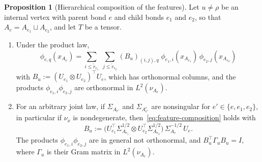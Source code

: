 \documentclass[11pt]{article}
\theoremstyle{definition}
\newtheorem{proposition}[theorem]{Proposition}
\numberwithin{equation}{section}
\begin{document}
\begin{proposition}[Hierarchical composition of the features]\label{prop:dw-nested}
Let $u\neq\rho$ be an internal vertex with parent bond $e$ and child bonds $e_1$ and $e_2$, so that $A_e=A_{e_1}\sqcup A_{e_2}$, and let $T$ be a tensor.
\begin{enumerate}[label=(\roman*),nosep]
\item Under the product law,
\begin{equation}\label{eq:feature-composition}
\phi_{e,q}(x_{A_e})=\sum_{i\le\tilde r_{e_1}}\ \sum_{j\le\tilde r_{e_2}}(B_u)_{(i,j),q}\;\phi_{e_1,i}(x_{A_{e_1}})\,\phi_{e_2,j}(x_{A_{e_2}})
\end{equation}
with $B_u:=(U_{e_1}\otimes U_{e_2})^\top U_e$, which has orthonormal columns, and the products $\phi_{e_1,i}\phi_{e_2,j}$ are orthonormal in $L^2(\nu_{A_e})$.
\item For an arbitrary joint law, if $\Sigma_{A_{e'}}$ and $\Sigma_{A_{e'}^c}$ are nonsingular for $e'\in\{e,e_1,e_2\}$, in particular if $\nu_x$ is nondegenerate, then~\eqref{eq:feature-composition} holds with
\[
B_u:=\big(U_{e_1}^\top\Sigma_{A_{e_1}}^{1/2}\otimes U_{e_2}^\top\Sigma_{A_{e_2}}^{1/2}\big)\,\Sigma_{A_e}^{-1/2}\,U_e .
\]
The products $\phi_{e_1,i}\phi_{e_2,j}$ are in general not orthonormal, and $B_u^\top\Gamma_uB_u=I$, where $\Gamma_u$ is their Gram matrix in $L^2(\nu_{A_e})$.
\end{enumerate}
\end{proposition}
\end{document}
